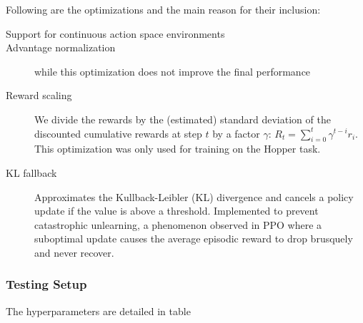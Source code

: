 Following are the optimizations and the main reason for their inclusion:

\begin{description}
\item[Support for continuous action space environments] %
\item[Advantage normalization] while this optimization does not improve the final performance\cite{andrychowicz2020learning}
\item[Reward scaling] We divide the rewards by the (estimated) standard deviation of the discounted cumulative rewards at step $t$ by a factor $\gamma$: $R_t = \sum_{i=0}^t \gamma^{t-i} r_i$. This optimization was only used for training on the Hopper task.
\item[KL fallback] Approximates the Kullback-Leibler (KL) divergence and cancels a policy update if the value is above a threshold. Implemented to prevent catastrophic unlearning\cite{dossa2021empirical}, a phenomenon observed in PPO where a suboptimal update causes the average episodic reward to drop brusquely and never recover.
\end{description}

\subsubsection{Testing Setup}


The hyperparameters are detailed in table %

